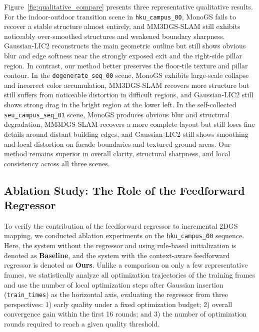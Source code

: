 \documentclass[lettersize,journal]{IEEEtran}
\begin{document}
Figure~\ref{fig:qualitative_compare} presents three representative qualitative results. For the indoor-outdoor transition scene in \texttt{hku\_campus\_00}, MonoGS fails to recover a stable structure almost entirely, and MM3DGS-SLAM still exhibits noticeably over-smoothed structures and weakened boundary sharpness. Gaussian-LIC2 reconstructs the main geometric outline but still shows obvious blur and edge softness near the strongly exposed exit and the right-side pillar region. In contrast, our method better preserves the floor-tile texture and pillar contour. In the \texttt{degenerate\_seq\_00} scene, MonoGS exhibits large-scale collapse and incorrect color accumulation, MM3DGS-SLAM recovers more structure but still suffers from noticeable distortion in difficult regions, and Gaussian-LIC2 still shows strong drag in the bright region at the lower left. In the self-collected \texttt{seu\_campus\_seq\_01} scene, MonoGS produces obvious blur and structural degradation, MM3DGS-SLAM recovers a more complete layout but still loses fine details around distant building edges, and Gaussian-LIC2 still shows smoothing and local distortion on facade boundaries and textured ground areas. Our method remains superior in overall clarity, structural sharpness, and local consistency across all three scenes.

\subsection{Ablation Study: The Role of the Feedforward Regressor}

To verify the contribution of the feedforward regressor to incremental 2DGS mapping, we conducted ablation experiments on the \texttt{hku\_campus\_00} sequence. Here, the system without the regressor and using rule-based initialization is denoted as \textbf{Baseline}, and the system with the context-aware feedforward regressor is denoted as \textbf{Ours}. Unlike a comparison on only a few representative frames, we statistically analyze all optimization trajectories of the training frames and use the number of local optimization steps after Gaussian insertion (\texttt{train\_times}) as the horizontal axis, evaluating the regressor from three perspectives: 1) early quality under a fixed optimization budget; 2) overall convergence gain within the first 16 rounds; and 3) the number of optimization rounds required to reach a given quality threshold.
\end{document}
